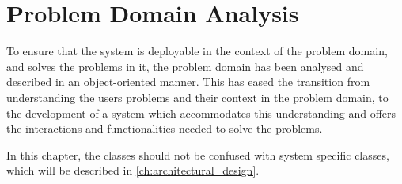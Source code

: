 \chapter{Problem Domain Analysis}\label{ch:problemdomain}
To ensure that the system is deployable in the context of the problem domain, and solves the problems in it, the problem domain has been analysed and described in an object-oriented manner. This has eased the transition from understanding the users problems and their context in the problem domain, to the development of a system which accommodates this understanding and offers the interactions and functionalities needed to solve the problems.
\par
In this chapter, the classes should not be confused with system specific classes, which will be described in \autoref{ch:architectural_design}.